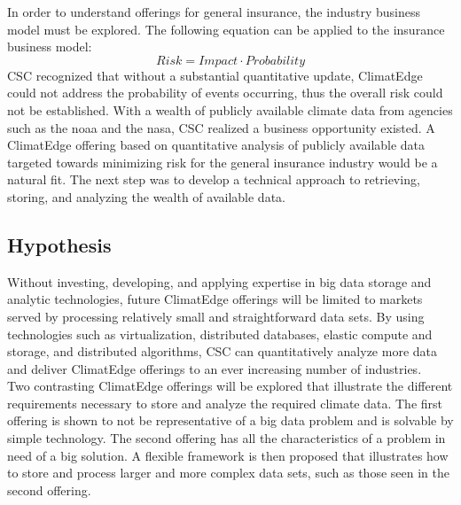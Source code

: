 In order to understand offerings for general insurance, the industry business model must be explored. The following equation can be applied to the insurance  business model: 
\begin{equation*}
    Risk = Impact \cdot Probability
\end{equation*}
\textsc{CSC} recognized that without a substantial quantitative update, ClimatEdge could not address the probability of events occurring, thus the overall risk could not be established. With a wealth of publicly available climate data from agencies such as the \gls{noaa} and the \gls{nasa}, \textsc{CSC} realized a business opportunity existed. A ClimatEdge offering based on quantitative analysis of publicly available data targeted towards minimizing risk for the general insurance industry would be a natural fit. The next step was to develop a technical approach to retrieving, storing, and analyzing the wealth of available data. 
\subsection{Hypothesis}
Without investing, developing, and applying expertise in big data  storage and analytic technologies, future ClimatEdge offerings will be limited to markets served by processing relatively small and straightforward data sets. By using technologies such as virtualization, distributed databases, elastic compute and storage, and distributed algorithms, \textsc{CSC} can quantitatively analyze more data and deliver ClimatEdge offerings to an ever increasing number of industries.\\

Two contrasting ClimatEdge offerings will be explored that illustrate the different requirements necessary to store and analyze the required climate data. The first offering is shown to not be representative of a big data problem and is solvable by simple technology. The second offering has all the characteristics of a problem in need of a big solution. A flexible framework is then proposed that illustrates how to store and process larger and more complex data sets, such as those seen in the second offering.
